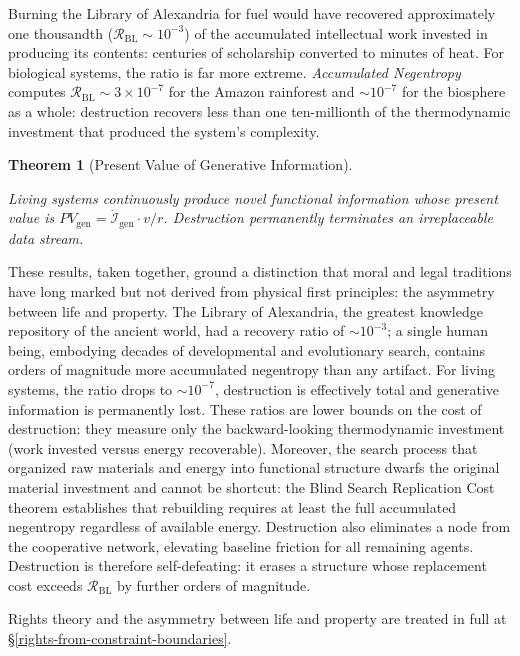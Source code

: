 \documentclass[11pt]{article}
\theoremstyle{plain}
\newtheorem{theorem}{Theorem}
\theoremstyle{definition}
\theoremstyle{remark}
\begin{document}
Burning the Library of Alexandria for fuel would have recovered
approximately one thousandth (\(\mathcal{R}_{\text{BL}} \sim 10^{-3}\))
of the accumulated intellectual work invested in producing its contents:
centuries of scholarship converted to minutes of heat. For biological
systems, the ratio is far more extreme. \emph{Accumulated Negentropy}
\citep{TC-III} computes
\(\mathcal{R}_{\text{BL}} \sim 3 \times 10^{-7}\) for the Amazon
rainforest and \(\sim 10^{-7}\) for the biosphere as a whole:
destruction recovers less than one ten-millionth of the thermodynamic
investment that produced the system's complexity.

\begin{theorem}[Present Value of Generative Information]
\label{ethics-thm-pv-gen-info}

Living systems continuously produce novel functional information whose present value is $PV_{\text{gen}} = \dot{\mathcal{I}}_{\text{gen}} \cdot v / r$. Destruction permanently terminates an irreplaceable data stream. \citep{TC-III}
\end{theorem}

These results, taken together, ground a distinction that moral and legal
traditions have long marked but not derived from physical first
principles: the asymmetry between life and property. The Library of
Alexandria, the greatest knowledge repository of the ancient world, had
a recovery ratio of \(\sim 10^{-3}\); a single human being, embodying
decades of developmental and evolutionary search, contains orders of
magnitude more accumulated negentropy than any artifact. For living
systems, the ratio drops to \(\sim 10^{-7}\), destruction is effectively
total and generative information is permanently lost. These ratios are
lower bounds on the cost of destruction: they measure only the
backward-looking thermodynamic investment (work invested versus energy
recoverable). Moreover, the search process that organized raw materials
and energy into functional structure dwarfs the original material
investment and cannot be shortcut: the Blind Search Replication Cost
theorem establishes that rebuilding requires at least the full
accumulated negentropy regardless of available energy. Destruction also
eliminates a node from the cooperative network, elevating baseline
friction for all remaining agents. Destruction is therefore
self-defeating: it erases a structure whose replacement cost exceeds
\(\mathcal{R}_{\text{BL}}\) by further orders of magnitude.

Rights theory and the asymmetry between life and property are treated in
full at §\ref{rights-from-constraint-boundaries}.
\end{document}
